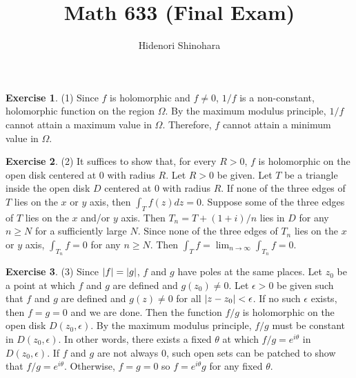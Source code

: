 \documentclass[12pt, psamsfonts]{amsart}
\theoremstyle{definition}
\newtheorem*{exer}{Exercise}
\theoremstyle{remark}
\numberwithin{equation}{section}
\begin{document}
\title{Math 633 (Final Exam)}
\author{Hidenori Shinohara}
\maketitle

\begin{exer}{(1)}
  Since $f$ is holomorphic and $f \ne 0$, $1 / f$ is a non-constant, holomorphic function on the region $\Omega$.
  By the maximum modulus principle, $1 / f$ cannot attain a maximum value in $\Omega$.
  Therefore, $f$ cannot attain a minimum value in $\Omega$.
\end{exer}

\begin{exer}{(2)}
  It suffices to show that, for every $R > 0$, $f$ is holomorphic on the open disk centered at 0 with radius $R$.
  Let $R > 0$ be given.
  Let $T$ be a triangle inside the open disk $D$ centered at 0 with radius $R$.
  If none of the three edges of $T$ lies on the $x$ or $y$ axis, then $\int_{T} f(z) dz = 0$.
  Suppose some of the three edges of $T$ lies on the $x$ and/or $y$ axis.
  Then $T_n = T + (1 + i) / n$ lies in $D$ for any $n \geq N$ for a sufficiently large $N$.
  Since none of the three edges of $T_n$ lies on the $x$ or $y$ axis, $\int_{T_n} f = 0$ for any $n \geq N$.
  Then $\int_{T} f = \lim_{n \rightarrow \infty} \int_{T_n} f = 0$.
\end{exer}

\begin{exer}{(3)}
  Since $\abs{f} = \abs{g}$, $f$ and $g$ have poles at the same places.
  Let $z_0$ be a point at which $f$ and $g$ are defined and $g(z_0) \ne 0$.
  Let $\epsilon > 0$ be given such that $f$ and $g$ are defined and $g(z) \ne 0$ for all $\abs{z - z_0} < \epsilon$.
  If no such $\epsilon$ exists, then $f = g = 0$ and we are done.
  Then the function $f / g$ is holomorphic on the open disk $D(z_0, \epsilon)$.
  By the maximum modulus principle, $f / g$ must be constant in $D(z_0, \epsilon)$.
  In other words, there exists a fixed $\theta$ at which $f / g = e^{i\theta}$ in $D(z_0, \epsilon)$.
  If $f$ and $g$ are not always 0, such open sets can be patched to show that $f / g = e^{i\theta}$.
  Otherwise, $f = g = 0$ so $f = e^{i\theta}g$ for any fixed $\theta$.
\end{exer}
\end{document}
